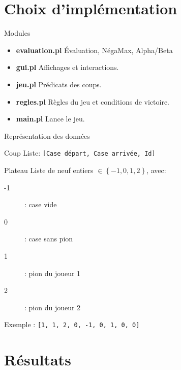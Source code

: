 \documentclass[compress, 12pt]{beamer}
\begin{document}
\section{Choix d’implémentation}
    \begin{frame}{Modules}
  \begin{itemize}
    \item \textbf{evaluation.pl} Évaluation, NégaMax, Alpha/Beta
    \item \textbf{gui.pl} Affichages et interactions.
    \item \textbf{jeu.pl} Prédicats des coups.
    \item \textbf{regles.pl} Règles du jeu et conditions de victoire.
    \item \textbf{main.pl} Lance le jeu.
  \end{itemize}
    \end{frame}

\begin{frame}{Représentation des données}
    \begin{block}{Coup}
          Liste: \texttt{[Case départ, Case arrivée, Id]}
    \end{block}
    \begin{block}{Plateau}
        Liste de neuf entiers $\in \left\{-1, 0, 1, 2\right\}$, avec:
        \begin{description}
	        \item [-1] : case vide
	        \item [0] : case sans pion
	        \item [1] : pion du joueur 1
	        \item [2] : pion du joueur 2
        \end{description}
        Exemple : \texttt{[1, 1, 2, 0, -1, 0, 1, 0, 0]}
    \end{block}
\end{frame}

\section{Résultats}
\end{document}
